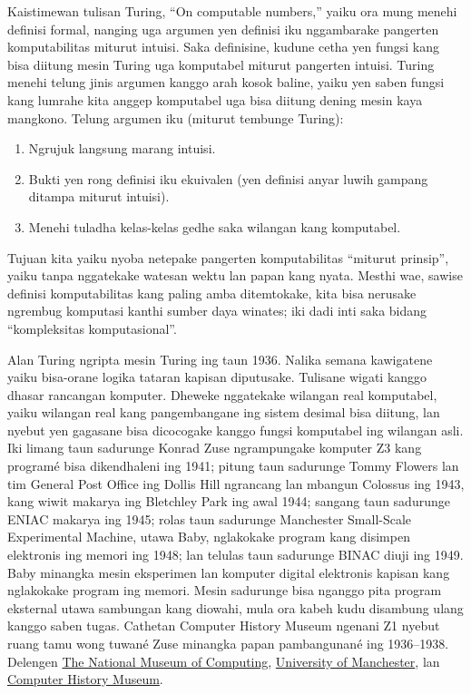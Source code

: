 \documentclass[../../../include/open-logic-section]{subfiles}
\begin{document}
\begin{digress}
Kaistimewan tulisan Turing, ``On computable numbers,''
yaiku ora mung menehi definisi formal, nanging
uga argumen yen definisi iku nggambarake
pangerten komputabilitas miturut intuisi.
Saka definisine, kudune cetha yen fungsi kang
bisa diitung mesin Turing uga komputabel miturut
pangerten intuisi. Turing menehi telung jinis
argumen kanggo arah kosok baline, yaiku yen
saben fungsi kang lumrahe kita anggep komputabel
uga bisa diitung dening mesin kaya mangkono.
Telung argumen iku (miturut tembunge Turing):
\begin{enumerate}
\item Ngrujuk langsung marang intuisi.
\item Bukti yen rong definisi iku ekuivalen
  (yen definisi anyar luwih gampang ditampa
  miturut intuisi).
\item Menehi tuladha kelas-kelas gedhe
  saka wilangan kang komputabel.
\end{enumerate}
Tujuan kita yaiku nyoba netepake pangerten
komputabilitas ``miturut prinsip'', yaiku
tanpa nggatekake watesan wektu lan papan
kang nyata. Mesthi wae, sawise definisi
komputabilitas kang paling amba ditemtokake,
kita bisa nerusake ngrembug komputasi kanthi
sumber daya winates; iki dadi inti saka
bidang ``kompleksitas komputasional''.
\end{digress}

\begin{history}
Alan Turing ngripta mesin Turing ing taun 1936. Nalika semana kawigatene yaiku bisa-orane logika tataran kapisan diputusake. Tulisane wigati kanggo dhasar rancangan komputer. Dheweke nggatekake wilangan real komputabel, yaiku wilangan real kang pangembangane ing sistem desimal bisa diitung, lan nyebut yen gagasane bisa dicocogake kanggo fungsi komputabel ing wilangan asli.
Iki limang taun sadurunge Konrad Zuse ngrampungake komputer Z3 kang programé bisa dikendhaleni ing 1941; pitung taun sadurunge Tommy Flowers lan tim General Post Office ing Dollis Hill ngrancang lan mbangun Colossus ing 1943, kang wiwit makarya ing Bletchley Park ing awal 1944; sangang taun sadurunge ENIAC makarya ing 1945; rolas taun sadurunge Manchester Small-Scale Experimental Machine, utawa Baby, nglakokake program kang disimpen elektronis ing memori ing 1948; lan telulas taun sadurunge BINAC diuji ing 1949.
Baby minangka mesin eksperimen lan komputer digital elektronis kapisan kang nglakokake program ing memori. Mesin sadurunge bisa nganggo pita program eksternal utawa sambungan kang diowahi, mula ora kabeh kudu disambung ulang kanggo saben tugas. Cathetan Computer History Museum ngenani Z1 nyebut ruang tamu wong tuwané Zuse minangka papan pambangunané ing 1936--1938. Delengen \href{https://www.tnmoc.org/colossus}{The National Museum of Computing}, \href{https://www.manchester.ac.uk/about/news/university-celebrates-babys-65th-birthday/}{University of Manchester}, lan \href{https://www.computerhistory.org/revolution/birth-of-the-computer/4/84/336}{Computer History Museum}.
\end{history}
\end{document}
